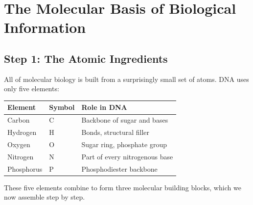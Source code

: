 \section{The Molecular Basis of Biological Information}
\label{sec:molecular-basis}

\subsection{Step 1: The Atomic Ingredients}
\label{subsec:atoms}

All of molecular biology is built from a surprisingly small set of atoms. DNA uses only five elements:

\begin{center}
\renewcommand{\arraystretch}{1.15}
\begin{tabularx}{0.85\textwidth}{C{2cm} C{3cm} Y}
\toprule
\textbf{Element} & \textbf{Symbol} & \textbf{Role in DNA} \\
\midrule
Carbon   & C & Backbone of sugar and bases \\
Hydrogen & H & Bonds, structural filler \\
Oxygen   & O & Sugar ring, phosphate group \\
Nitrogen & N & Part of every nitrogenous base \\
Phosphorus & P & Phosphodiester backbone \\
\bottomrule
\end{tabularx}
\end{center}

These five elements combine to form three molecular building blocks, which we now assemble step by step.

